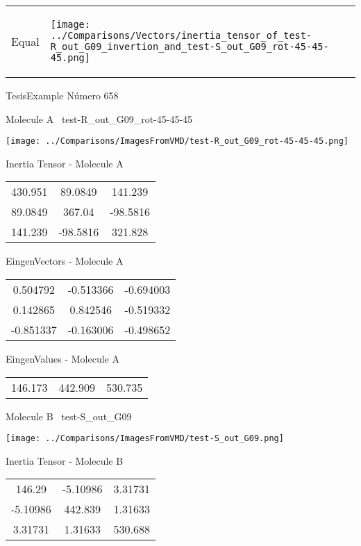 \vtab[-5mm]
\begin{tabular}{*{2}{m{}}}
\begin{center}
\textcolor{NavyBlue}{\Large Equal}
\end{center}
&
\begin{center}
\texttt{[image: ../Comparisons/Vectors/inertia\_tensor\_of\_test-R\_out\_G09\_invertion\_and\_test-S\_out\_G09\_rot-45-45-45.png]}
\end{center}
\end{tabular}

 \newpage

\vtab[-3cm]
\begin{center}
{\large TesisExample \tab Número 658}
\end{center}
\begin{multicols}{2}
\begin{center}

Molecule A \
test-R\_out\_G09\_rot-45-45-45

\texttt{[image: ../Comparisons/ImagesFromVMD/test-R\_out\_G09\_rot-45-45-45.png]}

Inertia Tensor - Molecule A \\
\begin{tabular}{|c c c|}
430.951	 & 	89.0849	 & 	141.239	 \\
89.0849	 & 	367.04	 & 	-98.5816	 \\
141.239	 & 	-98.5816	 & 	321.828
\end{tabular}

\vtab
 EingenVectors - Molecule A     \\
\begin{tabular}{|c c c|}
0.504792	 & 	-0.513366	 & 	-0.694003	 \\
0.142865	 & 	0.842546	 & 	-0.519332	 \\
-0.851337	 & 	-0.163006	 & 	-0.498652
\end{tabular}

\vtab
 EingenValues - Molecule A     \\
\begin{tabular}{|c c c|}
146.173	 & 	442.909	 & 	530.735	 \\
\end{tabular}
\columnbreak

Molecule B \
test-S\_out\_G09

\texttt{[image: ../Comparisons/ImagesFromVMD/test-S\_out\_G09.png]}

Inertia Tensor - Molecule B \\
\begin{tabular}{|c c c|}
146.29	 & 	-5.10986	 & 	3.31731	 \\
-5.10986	 & 	442.839	 & 	1.31633	 \\
3.31731	 & 	1.31633	 & 	530.688
\end{tabular}


\end{center}
\end{multicols}
